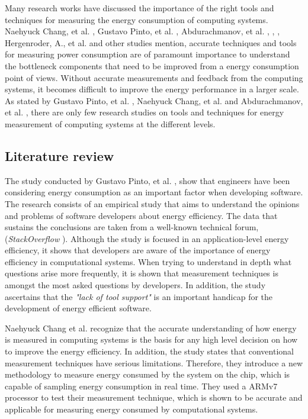 Many research works have discussed the importance of the right tools and techniques for measuring the energy consumption of computing systems. Naehyuck Chang, et al. \cite{CYCLE_ENERGY}, Gustavo Pinto, et al. \cite{QUESTIONS_ENERGY}, Abdurachmanov, et al. \cite{ACAT14ARMDAVID}, \cite{ACAT13ARM}, \cite{ACAT}, Hergenroder, A., et al. \cite{WIRELESS_ENERGY} and other studies mention, accurate techniques and tools for measuring power consumption are of paramount importance to understand the bottleneck components that need to be improved from a energy consumption point of views. Without accurate measurements and feedback from the computing systems, it becomes difficult to improve the energy performance in a larger scale. As stated by  Gustavo Pinto, et al. \cite{QUESTIONS_ENERGY}, Naehyuck Chang, et al. \cite{CYCLE_ENERGY} and Abdurachmanov, et al. \cite{ACAT}, there are only few research studies on tools and techniques for energy measurement of computing systems at the different levels.   


\subsection*{Literature review}
The study conducted by Gustavo Pinto, et al. \cite{QUESTIONS_ENERGY}, show that engineers have been
considering energy consumption as an important factor when developing software.
The research consists of an empirical study that aims to understand the opinions and
problems of software developers about energy efficiency. The data that sustains
the conclusions are  taken from
a well-known technical forum, (\textit{StackOverflow} \cite{STACKOVERFLOW}).
Although the study is focused in an application-level energy efficiency, it
shows that developers are aware of the importance of energy efficiency in 
computational systems. When trying to understand in depth what questions arise 
more frequently, it is shown that measurement techniques is amongst the most
asked questions by developers. In addition, the study ascertains that the 
\textit{"lack of tool support"} is an important handicap for the development of 
energy efficient software.

Naehyuck Chang et al. \cite{CYCLE_ENERGY} recognize that the accurate understanding of how energy is measured in computing systems is the basis for any high level decision on how to improve the energy efficiency. In addition, the study states that conventional measurement techniques have serious limitations. Therefore, they introduce a new methodology to measure energy consumed by the system on the chip, which is capable of sampling energy consumption in real time. They used a ARMv7 processor to test their measurement technique, which is shown to be accurate and applicable for measuring energy consumed by computational systems.


